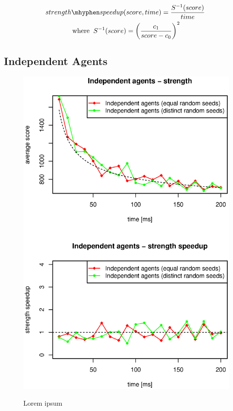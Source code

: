 \begin{multline}
        strength\mhyphen speedup(score, time) = {{ S^{-1}(score) } \over time }\;
        \\
        \mathrm{where}\;\;S^{-1}(score) = {\left({c_1 \over {score - c_0}}\right)}^2
\end{multline}



\subsection{Independent Agents}


\begin{figure}
\begin{center}
\includegraphics{img/dummy-ghosts-strength.eps}
\end{center}
\caption{\footnotesize Lorem ipsum}{\footnotesize }
\label{fig_independent_agents_strength}
\end{figure}

